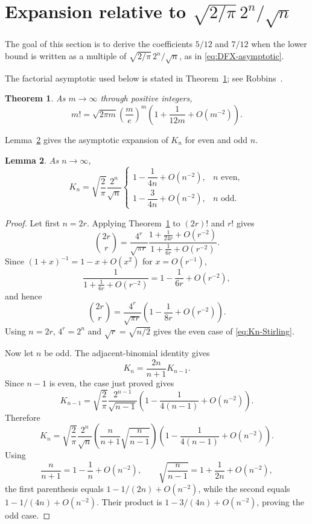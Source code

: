 \documentclass[10pt]{amsart}
\newtheorem{theorem}{Theorem}[section]
\newtheorem{lemma}[theorem]{Lemma}
\numberwithin{equation}{section}
\begin{document}
\section{Expansion relative to \texorpdfstring{$\sqrt{2/\pi}\,2^n/\sqrt n$}{sqrt(2/pi) times 2 to the n over sqrt(n)}}\label{sec:gaussian}

The goal of this section is to derive the coefficients $5/12$ and $7/12$ when
the lower bound is written as a multiple of
$\sqrt{2/\pi}\,2^n/\sqrt n$, as in \cref{eq:DFX-asymptotic}.

The factorial asymptotic used below is stated in Theorem~\ref{thm:Stirling}; see
Robbins~\cite{Robbins1955}.

\begin{theorem}\label{thm:Stirling}
As $m\to\infty$ through positive integers,
\begin{equation}\label{eq:Stirling}
 m!=\sqrt{2\pi m}\left(\frac me\right)^m
 \left(1+\frac{1}{12m}+O(m^{-2})\right).
\end{equation}
\end{theorem}

Lemma~\ref{lem:Kn-Stirling} gives the asymptotic expansion of $K_n$ for even and
odd $n$.

\begin{lemma}\label{lem:Kn-Stirling}
As $n\to\infty$,
\begin{equation}\label{eq:Kn-Stirling}
 K_n=\sqrt{\frac2\pi}\frac{2^n}{\sqrt n}
 \begin{cases}
  1-\dfrac{1}{4n}+O(n^{-2}),&n\text{ even},\\[6pt]
  1-\dfrac{3}{4n}+O(n^{-2}),&n\text{ odd}.
 \end{cases}
\end{equation}
\end{lemma}

\begin{proof}
Let first $n=2r$.  Applying Theorem~\ref{thm:Stirling} to $(2r)!$ and $r!$ gives
\[
 \binom{2r}{r}
 =\frac{4^r}{\sqrt{\pi r}}
 \frac{1+\frac{1}{24r}+O(r^{-2})}
      {1+\frac{1}{6r}+O(r^{-2})}.
\]
Since $(1+x)^{-1}=1-x+O(x^2)$ for $x=O(r^{-1})$,
\[
 \frac{1}{1+\frac{1}{6r}+O(r^{-2})}
 =1-\frac{1}{6r}+O(r^{-2}),
\]
and hence
\[
 \binom{2r}{r}
 =\frac{4^r}{\sqrt{\pi r}}
 \left(1-\frac{1}{8r}+O(r^{-2})\right).
\]
Using $n=2r$, $4^r=2^n$ and $\sqrt r=\sqrt{n/2}$ gives the even case of
\cref{eq:Kn-Stirling}.

Now let $n$ be odd.  The adjacent-binomial identity gives
\[
 K_n=\frac{2n}{n+1}K_{n-1}.
\]
Since $n-1$ is even, the case just proved gives
\[
 K_{n-1}
 =\sqrt{\frac2\pi}\frac{2^{n-1}}{\sqrt{n-1}}
 \left(1-\frac{1}{4(n-1)}+O(n^{-2})\right).
\]
Therefore
\[
 K_n
 =\sqrt{\frac2\pi}\frac{2^n}{\sqrt n}
 \left(\frac{n}{n+1}\sqrt{\frac{n}{n-1}}\right)
 \left(1-\frac{1}{4(n-1)}+O(n^{-2})\right).
\]
Using
\[
 \frac{n}{n+1}=1-\frac1n+O(n^{-2}),
 \qquad
 \sqrt{\frac{n}{n-1}}=1+\frac{1}{2n}+O(n^{-2}),
\]
the first parenthesis equals $1-1/(2n)+O(n^{-2})$, while the second equals
$1-1/(4n)+O(n^{-2})$.  Their product is
$1-3/(4n)+O(n^{-2})$, proving the odd case.
\end{proof}
\end{document}
